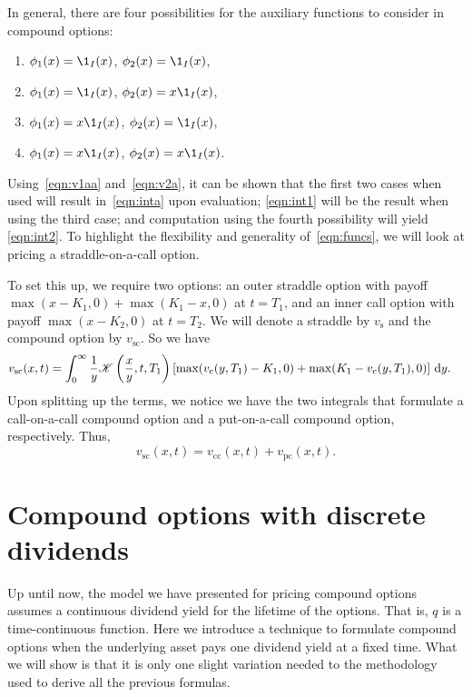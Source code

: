 In general, there are four possibilities for the auxiliary functions to consider in compound options:
	\begin{enumerate}
		\item $\phi_1(x) = \1_I(x)$, $\phi_2(x) = \1_I(x)$,
		\item $\phi_1(x) = \1_I(x)$, $\phi_2(x) = x\1_I(x)$,
		\item $\phi_1(x) = x\1_I(x)$, $\phi_2(x) = \1_I(x)$,
		\item $\phi_1(x) = x\1_I(x)$, $\phi_2(x) = x\1_I(x)$.
	\end{enumerate}
Using~\eqref{eqn:v1aa} and~\eqref{eqn:v2a}, it can be shown that the first two cases when used will result in~\eqref{eqn:inta} upon evaluation; \eqref{eqn:int1} will be the result when using the third case; and computation using the fourth possibility will yield \eqref{eqn:int2}. To highlight the flexibility and generality of~\eqref{eqn:funcs}, we will look at pricing a straddle-on-a-call option.

To set this up, we require two options: an outer straddle option with payoff $\max(x-K_1,0) + \max(K_1-x,0)$ at $t = T_1$, and an inner call option with payoff $\max(x-K_2,0)$ at $t = T_2$. We will denote a straddle by $v_{\text{s}}$ and the compound option by $v_{\text{sc}}$. So we have
	\begin{align*}
		v_\text{sc}(x,t) &= \int_0^\infty \frac{1}{y}\mathscr K\left( \frac{x}{y}, t, T_1 \right)\left[\max(v_\text{c}(y,T_1) - K_1, 0) + \max(K_1 - v_\text{c}(y,T_1), 0) \right] \, \mathrm d y.
	\end{align*}
Upon splitting up the terms, we notice we have the two integrals that formulate a call-on-a-call compound option and a put-on-a-call compound option, respectively. Thus,
	\begin{equation}
		\label{eqn:vsc}
			v_\text{sc}(x,t) = v_\text{cc}(x,t) + v_\text{pc}(x,t).
	\end{equation}
	
\section{Compound options with discrete dividends}
Up until now, the model we have presented for pricing compound options assumes a continuous dividend yield for the lifetime of the options. That is, $q$ is a time-continuous function. Here we introduce a technique to formulate compound options when the underlying asset pays one dividend yield at a fixed time. What we will show is that it is only one slight variation needed to the methodology used to derive all the previous formulas.

